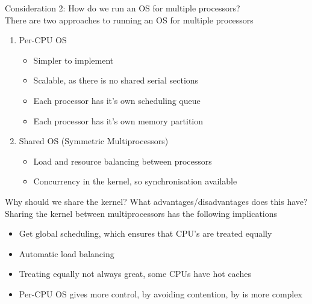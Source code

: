 \documentclass[journal, letterpaper]{IEEEtran}
\begin{document}
\begin{aside}{Consideration 2: How do we run an OS for multiple processors?} \\
    There are two approaches to running an OS for multiple processors
    \begin{enumerate}
        \item Per-CPU OS
        \begin{itemize}
            \item[\ding{51}] Simpler to implement
            \item[\ding{51}] Scalable, as there is no shared serial sections
            \item[\ding{55}] Each processor has it's own scheduling queue
            \item[\ding{55}] Each processor has it's own memory partition
        \end{itemize}
        \item Shared OS (Symmetric Multiprocessors)
        \begin{itemize}
            \item[\ding{51}] Load and resource balancing between processors
            \item[\ding{55}] Concurrency in the kernel, so synchronisation available
        \end{itemize}
    \end{enumerate}
\end{aside}
\begin{example}{Why should we share the kernel? What advantages/disadvantages does this have?} \\
    Sharing the kernel between multiprocessors has the following implications
    \begin{itemize}
        \item[\ding{51}] Get global scheduling, which ensures that CPU's are treated equally
        \item[\ding{51}] Automatic load balancing
        \item[\ding{55}] Treating equally not always great, some CPUs have hot caches
        \item[\ding{55}] Per-CPU OS gives more control, by avoiding contention, by is more complex 
    \end{itemize}
\end{example}
\end{document}

